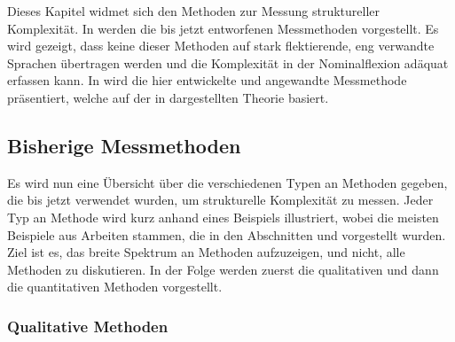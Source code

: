 \begin{exe}
\begin{exe}
Dieses Kapitel widmet sich den Methoden zur Messung struktureller Komplexität. In  werden die bis jetzt entworfenen Messmethoden vorgestellt. Es wird gezeigt, dass keine dieser Methoden auf stark flektierende, eng verwandte Sprachen übertragen werden und die Komplexität in der Nominalflexion adäquat erfassen kann. In  wird die hier entwickelte und angewandte Messmethode präsentiert, welche auf der in  dargestellten Theorie basiert.

\subsection{Bisherige Messmethoden}\label{4.3.1}

Es wird nun eine Übersicht über die verschiedenen Typen an Methoden gegeben, die bis jetzt verwendet wurden, um strukturelle Komplexität zu messen. Jeder Typ an Methode wird kurz anhand eines Beispiels illustriert, wobei die meisten Beispiele aus Arbeiten stammen, die in den Abschnitten  und  vorgestellt wurden. Ziel ist es, das breite Spektrum an Methoden aufzuzeigen, und nicht, alle Methoden zu diskutieren. In der Folge werden zuerst die qualitativen und dann die quantitativen Methoden vorgestellt.

\subsubsection{Qualitative Methoden}\label{4.3.1.1}


\end{exe}
\end{exe}
